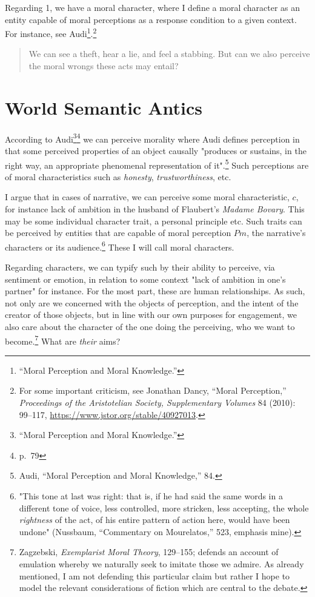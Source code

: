 \documentclass[phdthesis,12pt,final]{wuthesis}
\theoremstyle{definition}
\theoremstyle{definition}
\theoremstyle{definition}
\theoremstyle{definition}
\theoremstyle{remark}
\begin{document}
Regarding 1, we have a moral character, where I define a moral character as an entity capable of moral perceptions as a response condition to a given context. For instance, see Audi\footnote{{``Moral {Perception} and {Moral Knowledge}.''}}.\footnote{For some important criticism, see Jonathan Dancy, {``Moral {Perception},''} \emph{Proceedings of the Aristotelian Society, Supplementary Volumes} 84 (2010): 99--117, \url{https://www.jstor.org/stable/40927013}.}

\begin{quote}
We can see a theft, hear a lie, and feel a stabbing. But can we also perceive the moral wrongs these acts may entail?
\end{quote}

\section{World Semantic Antics}\label{world-semantic-antics}

According to Audi\footnote{{``Moral {Perception} and {Moral Knowledge}.''}}\footnote{p.~79} we can perceive morality where Audi defines perception in that some perceived properties of an object causally "produces or sustains, in the right way, an appropriate phenomenal representation of it".\footnote{Audi, {``Moral {Perception} and {Moral Knowledge},''} 84.} Such perceptions are of moral characteristics such as \emph{honesty}, \emph{trustworthiness}, etc.

I argue that in cases of narrative, we can perceive some moral characteristic, \(c\), for instance lack of ambition in the husband of Flaubert's \emph{Madame Bovary}. This may be some individual character trait, a personal principle etc. Such traits can be perceived by entities that are capable of moral perception \(Pm\), the narrative's characters or its audience.\footnote{"\textquotesingle This tone at last was right\textquotesingle: that is, if he had said the same words in a different tone of voice, less controlled, more stricken, less accepting, the whole \emph{rightness} of the act, of his entire pattern of action here, would have been undone" (Nussbaum, {``Commentary on {Mourelatos},''} 523, emphasis mine).} These I will call moral characters.

Regarding characters, we can typify such by their ability to perceive, via sentiment or emotion, in relation to some context "lack of ambition in one's partner" for instance. For the most part, these are human relationships. As such, not only are we concerned with the objects of perception, and the intent of the creator of those objects, but in line with our own purposes for engagement, we also care about the character of the one doing the perceiving, who we want to become.\footnote{Zagzebski, \emph{Exemplarist {Moral Theory}}, 129--155; defends an account of emulation whereby we naturally seek to imitate those we admire. As already mentioned, I am not defending this particular claim but rather I hope to model the relevant considerations of fiction which are central to the debate.} What are \emph{their} aims?
\end{document}
